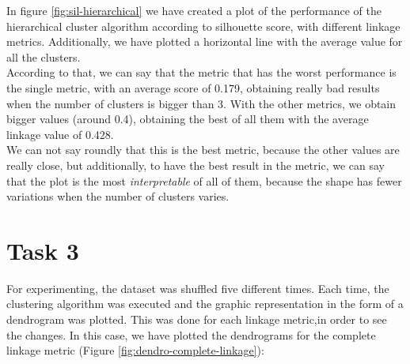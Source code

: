\documentclass[12pt]{article}
\begin{document}
In figure \ref{fig:sil-hierarchical} we have created a plot of the performance of the hierarchical cluster algorithm according to silhouette score, with different linkage metrics. Additionally, we have plotted a horizontal line with the average value for all the clusters.\\

According to that, we can say that the metric that has the worst performance is the single metric, with an average score of 0.179, obtaining really bad results when the number of clusters is bigger than 3. With the other metrics, we obtain bigger values (around 0.4), obtaining the best of all them with the average linkage value of 0.428.\\ 

We can not say roundly that this is the best metric, because the other values are really close, but additionally, to have the best result in the metric, we can say that the plot is the most \textit{interpretable} of all of them, because the shape has fewer variations when the number of clusters varies.

\section{Task 3}

For experimenting, the dataset was shuffled five different times. Each time, the clustering algorithm was executed and the graphic representation in the form of a dendrogram was plotted. This was done for each linkage metric,in order to see the changes. In this case, we have plotted the dendrograms for the complete linkage metric (Figure \ref{fig:dendro-complete-linkage}):\\
\end{document}
